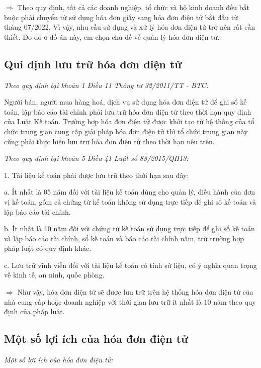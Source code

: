 $\Rightarrow$ Theo quy định, tất cả các doanh nghiệp, tổ chức và hộ kinh doanh đều bắt buộc phải chuyển từ sử dụng hóa đơn giấy sang hóa đơn điện tử bắt đầu từ tháng 07/2022. Vì vậy, nhu cầu sử dụng và xử lý hóa đơn điện tử trở nên rất cần thiết.      Do đó ở đồ án này, em chọn chủ đề về quản lý hóa đơn điện tử.

\subsection{Qui định lưu trữ hóa đơn điện tử}

\emph{Theo quy định tại khoản 1 Điều 11 Thông tư 32/2011/TT - BTC:}


Người bán, người mua hàng hoá, dịch vụ sử dụng hóa đơn điện tử để ghi sổ kế toán, lập báo cáo tài chính phải lưu trữ hóa đơn điện tử theo thời hạn quy định của Luật Kế toán. Trường hợp hóa đơn điện tử được khởi tạo từ hệ thống của tổ chức trung gian cung cấp giải pháp hóa đơn điện tử thì tổ chức trung gian này cũng phải thực hiện lưu trữ hóa đơn điện tử theo thời hạn nêu trên.


\emph{Theo quy định tại khoản 5 Điều 41 Luật số 88/2015/QH13:}


1. Tài liệu kế toán phải được lưu trữ theo thời hạn sau đây:

a. Ít nhất là 05 năm đối với tài liệu kế toán dùng cho quản lý, điều hành của đơn vị kế toán, gồm cả chứng từ kế toán không sử dụng trực tiếp để ghi sổ kế toán và lập báo cáo tài chính.

b. Ít nhất là 10 năm đối với chứng từ kế toán sử dụng trực tiếp để ghi sổ kế toán và lập báo cáo tài chính, sổ kế toán và báo cáo tài chính năm, trừ trường hợp pháp luật có quy định khác.

c. Lưu trữ vĩnh viễn đối với tài liệu kế toán có tính sử liệu, có ý nghĩa quan trọng về kinh tế, an ninh, quốc phòng.



$\Rightarrow$ Như vậy, hóa đơn điện tử sẽ được lưu trữ trên hệ thống hóa đơn điện tử của nhà cung cấp hoặc doanh nghiệp với thời gian lưu trữ ít nhất là 10 năm theo quy định của pháp luật.

\subsection{Một số lợi ích của hóa đơn điện tử}

\emph{Một số lợi ích của hóa đơn điện tử:}

